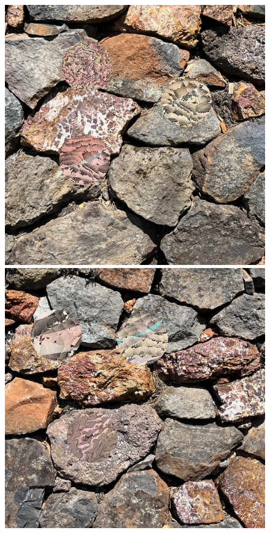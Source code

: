\documentclass[acmtog]{acmart}
\begin{document}
\begin{figure}
    \includegraphics[scale=0.24]{20221112_1555_step_6495.png}
    \hfill
    \includegraphics[scale=0.24]{20221112_1555_step_5510.png}

\end{figure}
\end{document}
